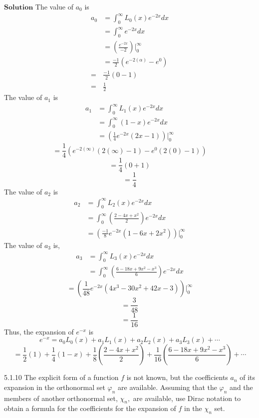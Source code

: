 \documentclass{article}
\begin{document}
\begin{flushleft}
$\boxed{\textbf{Solution}}$ The value of $a_0$ is
$$
\begin{aligned}
a_{0} &=\int_{0}^{\infty} L_{0}(x) e^{-2 x} d x \\
&=\int_{0}^{\infty} e^{-2 x} d x \\
&=\left(\frac{e^{-2 x}}{-2}\right)\Bigg|_{0}^{\infty} \\
&=\frac{-1}{2}\left(e^{-2(\alpha)}-e^{0}\right) \\
=& \frac{-1}{2}(0-1) \\
=& \frac{1}{2}
\end{aligned}
$$
The value of $a_1$ is
$$
\begin{aligned}
a_{1} &=\int_{0}^{\infty} L_{1}(x) e^{-2 x} d x \\
&=\int_{0}^{\infty}(1-x) e^{-2 x} d x \\
&=\left(\frac{1}{4} e^{-2 x}(2 x-1)\right)\Bigg|_{0}^{\infty}
\end{aligned}
$$
$$
=\frac{1}{4}\left(e^{-2(\infty)}(2(\infty)-1)-e^{0}(2(0)-1)\right)
$$
$$=\frac{1}{4}(0+1)$$
$$=\frac{1}{4}$$
The value of $a_2$ is
$$
\begin{aligned}
a_{2} &=\int_{0}^{\infty} L_{2}(x) e^{-2 x} d x \\
&=\int_{0}^{\infty}\left(\frac{2-4 x+x^{2}}{2}\right) e^{-2 x} d x \\
&=\left(\frac{-1}{8} e^{-2 x}\left(1-6 x+2 x^{2}\right)\right)\Bigg|_{0}^{\infty}
\end{aligned}
$$
The value of $a_{3}$ is,
$$
\begin{aligned}
a_{3} &=\int_{0}^{\infty} L_{3}(x) e^{-2 x} d x \\
&=\int_{0}^{\infty}\left(\frac{6-18 x+9 x^{2}-x^{3}}{6}\right) e^{-2 x} d x
\end{aligned}
$$
$$
=\left(\frac{1}{48} e^{-2 x}\left(4 x^{3}-30 x^{2}+42 x-3\right)\right)\Bigg|_{0}^{\infty}
$$
$$=\frac{3}{48}$$
$$=\frac{1}{16}$$
Thus, the expansion of $e^{-x}$ is
$$
e^{-x}=a_{0} L_{0}(x)+a_{1} L_{1}(x)+a_{2} L_{2}(x)+a_{3} L_{3}(x)+\cdots
$$
$$
=\frac{1}{2}(1)+\frac{1}{4}(1-x)+\frac{1}{8}\left(\frac{2-4 x+x^{2}}{2}\right)+\frac{1}{16}\left(\frac{6-18 x+9 x^{2}-x^{3}}{6}\right)+\cdots
$$

\newpage

\begin{mybox}{5.1.10}
The explicit form of a function $f$ is not known, but the coefficients $a_{n}$ of its expansion in the orthonormal set $\varphi_{n}$ are available. Assuming that the $\varphi_{n}$ and the members of another orthonormal set, $\chi_{n},$ are available, use Dirac notation to obtain a formula for the coefficients for the expansion of $f$ in the $\chi_{n}$ set.
\end{mybox}


\end{flushleft}
\end{document}
